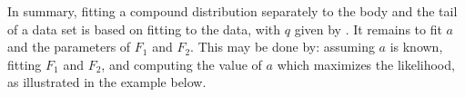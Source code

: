 In summary, fitting a compound distribution separately to the
body and the tail of a data set is based on fitting
 to the data, with $q$ given by
. It remains to fit $a$ and the parameters
of $F_1$ and $F_2$. This may be done by: assuming $a$ is known,
fitting $F_1$ and $F_2$, and computing the value of $a$ which
maximizes the likelihood, as illustrated in the example below.
%
%
%
\begin{figure}[htbp]
\centering
{}
\end{figure}
%
%
%
%
